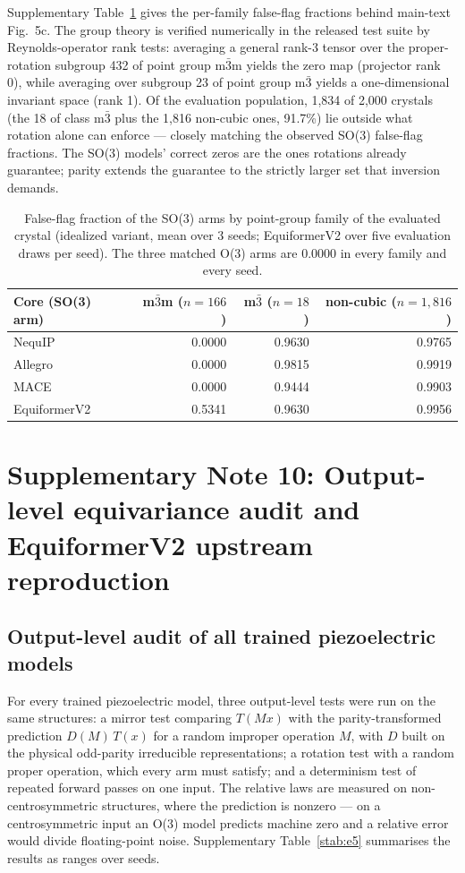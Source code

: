 Supplementary Table~\ref{stab:e7} gives the per-family false-flag fractions behind main-text Fig.~5c. The group theory is verified numerically in the released test suite by Reynolds-operator rank tests: averaging a general rank-3 tensor over the proper-rotation subgroup 432 of point group m$\bar 3$m yields the zero map (projector rank 0), while averaging over subgroup 23 of point group m$\bar 3$ yields a one-dimensional invariant space (rank 1). Of the evaluation population, 1,834 of 2,000 crystals (the 18 of class m$\bar 3$ plus the 1,816 non-cubic ones, 91.7\%) lie outside what rotation alone can enforce --- closely matching the observed SO(3) false-flag fractions. The SO(3) models' correct zeros are the ones rotations already guarantee; parity extends the guarantee to the strictly larger set that inversion demands.

\begin{table}[htbp]
\centering
\small
\caption{False-flag fraction of the SO(3) arms by point-group family of the evaluated crystal (idealized variant, mean over 3 seeds; EquiformerV2 over five evaluation draws per seed). The three matched O(3) arms are 0.0000 in every family and every seed.}
\label{stab:e7}
\begin{tabular}{lrrr}
\toprule
Core (SO(3) arm) & m$\bar 3$m ($n{=}166$) & m$\bar 3$ ($n{=}18$) & non-cubic ($n{=}1{,}816$) \\
\midrule
NequIP & 0.0000 & 0.9630 & 0.9765 \\
Allegro & 0.0000 & 0.9815 & 0.9919 \\
MACE & 0.0000 & 0.9444 & 0.9903 \\
EquiformerV2 & 0.5341 & 0.9630 & 0.9956 \\
\bottomrule
\end{tabular}
\end{table}

\section*{Supplementary Note 10: Output-level equivariance audit and EquiformerV2 upstream reproduction}

\subsection*{Output-level audit of all trained piezoelectric models}

For every trained piezoelectric model, three output-level tests were run on the same structures: a mirror test comparing $T(Mx)$ with the parity-transformed prediction $D(M)\,T(x)$ for a random improper operation $M$, with $D$ built on the physical odd-parity irreducible representations; a rotation test with a random proper operation, which every arm must satisfy; and a determinism test of repeated forward passes on one input. The relative laws are measured on non-centrosymmetric structures, where the prediction is nonzero --- on a centrosymmetric input an O(3) model predicts machine zero and a relative error would divide floating-point noise. Supplementary Table~\ref{stab:e5} summarises the results as ranges over seeds.

